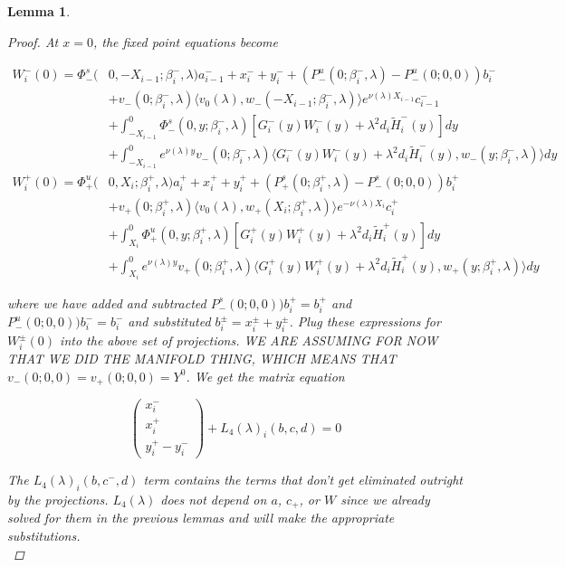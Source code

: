 \documentclass[12pt]{article}
\newtheorem{lemma}{Lemma}
\begin{document}
\begin{lemma}
\begin{proof}

At $x = 0$, the fixed point equations become

\begin{align*}
W_i^-(0) = \Phi^s_-(&0, -X_{i-1}; \beta_i^-, \lambda)a_{i-1}^- + x_i^- + y_i^- + (P^u_-(0; \beta_i^-, \lambda) - P^u_-(0; 0, 0))b_i^- \\
&+ v_-(0; \beta_i^-, \lambda) \langle v_0(\lambda), w_-(-X_{i-1}; \beta_i^-, \lambda) \rangle e^{\nu(\lambda)X_{i-1}} c_{i-1}^- \\
&+ \int_{-X_{i-1}}^0 \Phi^s_-(0, y; \beta_i^-, \lambda) [ G_i^-(y)W_i^-(y) + \lambda^2 d_i \tilde{H}_i^-(y) ] dy \\
&+ \int_{-X_{i-1}}^0
e^{\nu(\lambda)y} v_-(0; \beta_i^-, \lambda) \langle G_i^-(y)W_i^-(y) + \lambda^2 d_i \tilde{H}_i^-(y), w_-(y; \beta_i^-, \lambda) \rangle dy \\
W_i^+(0) = \Phi^u_+(&0, X_i; \beta_i^+, \lambda)a_i^+ + x_i^+ + y_i^+ + (P^s_+(0; \beta_i^+, \lambda) - P^s_-(0; 0, 0))b_i^+ \\
&+ v_+(0; \beta_i^+, \lambda) \langle v_0(\lambda), w_+(X_i; \beta_i^+, \lambda) \rangle e^{-\nu(\lambda) X_i} c_i^+ \\
&+ \int_{X_i}^0 \Phi^u_+(0, y; \beta_i^+, \lambda) [ G_i^+(y)W_i^+(y) + \lambda^2 d_i \tilde{H}_i^+(y) ] dy \\
&+ \int_{X_i}^0 e^{\nu(\lambda)y} v_+(0; \beta_i^+, \lambda) \langle G_i^+(y)W_i^+(y) + \lambda^2 d_i \tilde{H}_i^+(y), w_+(y; \beta_i^+, \lambda) \rangle dy
\end{align*}

where we have added and subtracted $P^s_-(0; 0, 0))b_i^+ = b_i^+$ and $P^u_-(0; 0, 0))b_i^- = b_i^-$ and substituted $b_i^\pm = x_i^\pm + y_i^\pm$. Plug these expressions for $W_i^\pm(0)$ into the above set of projections. WE ARE ASSUMING FOR NOW THAT WE DID THE MANIFOLD THING, WHICH MEANS THAT $v_-(0; 0, 0) = v_+(0; 0, 0) = Y^0$. We get the matrix equation

\[
\begin{pmatrix}x_i^- \\ x_i^+ \\ 
y_i^+ - y_i^- \end{pmatrix} + L_4(\lambda)_i(b, c, d) = 0
\]

The $L_4(\lambda)_i(b, c^-, d)$ term contains the terms that don't get eliminated outright by the projections. $L_4(\lambda)$ does not depend on $a$, $c_+$, or $W$ since we already solved for them in the previous lemmas and will make the appropriate substitutions.\\


\end{proof}
\end{lemma}
\end{document}
